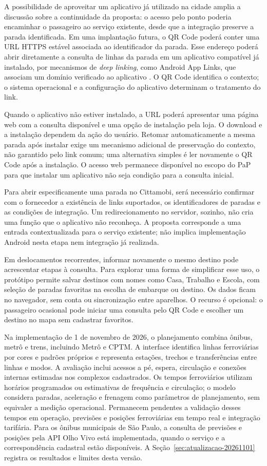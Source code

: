 A possibilidade de aproveitar um aplicativo já utilizado na cidade amplia a discussão sobre a continuidade da proposta: o acesso pelo ponto poderia encaminhar o passageiro ao serviço existente, desde que a integração preserve a parada identificada. Em uma implantação futura, o QR Code poderá conter uma URL HTTPS estável associada ao identificador da parada. Esse endereço poderá abrir diretamente a consulta de linhas da parada em um aplicativo compatível já instalado, por mecanismos de \textit{deep linking}, como Android App Links, que associam um domínio verificado ao aplicativo \citep{androidapplinks}. O QR Code identifica o contexto; o sistema operacional e a configuração do aplicativo determinam o tratamento do link.

Quando o aplicativo não estiver instalado, a URL poderá apresentar uma página web com a consulta disponível e uma opção de instalação pela loja. O download e a instalação dependem da ação do usuário. Retomar automaticamente a mesma parada após instalar exige um mecanismo adicional de preservação do contexto, não garantido pelo link comum; uma alternativa simples é ler novamente o QR Code após a instalação. O acesso web permanece disponível no escopo do PaP para que instalar um aplicativo não seja condição para a consulta inicial.

Para abrir especificamente uma parada no Cittamobi, será necessário confirmar com o fornecedor a existência de links suportados, os identificadores de paradas e as condições de integração. Um redirecionamento no servidor, sozinho, não cria uma função que o aplicativo não reconheça. A proposta corresponde a uma entrada contextualizada para o serviço existente; não implica implementação Android nesta etapa nem integração já realizada.

Em deslocamentos recorrentes, informar novamente o mesmo destino pode acrescentar etapas à consulta. Para explorar uma forma de simplificar esse uso, o protótipo permite salvar destinos com nomes como Casa, Trabalho e Escola, com seleção de paradas favoritas na escolha de embarque ou destino. Os dados ficam no navegador, sem conta ou sincronização entre aparelhos. O recurso é opcional: o passageiro ocasional pode iniciar uma consulta pelo QR Code e escolher um destino no mapa sem cadastrar favoritos.

Na implementação de 1 de novembro de 2026, o planejamento combina ônibus, metrô e trens, incluindo Metrô e CPTM. A interface identifica linhas ferroviárias por cores e padrões próprios e representa estações, trechos e transferências entre linhas e modos. A avaliação inclui acessos a pé, espera, circulação e conexões internas estimadas nos complexos cadastrados. Os tempos ferroviários utilizam horários programados ou estimativas de frequência e circulação; o modelo considera paradas, aceleração e frenagem como parâmetros de planejamento, sem equivaler a medição operacional. Permanecem pendentes a validação desses tempos em operação, previsões e posições ferroviárias em tempo real e integração tarifária. Para os ônibus municipais de São Paulo, a consulta de previsões e posições pela API Olho Vivo está implementada, quando o serviço e a correspondência cadastral estão disponíveis. A Seção~\ref{sec:atualizacao-20261101} registra os resultados e limites desta versão.


